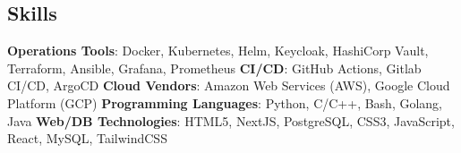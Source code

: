 \documentclass[../main.tex]{subfiles}
\begin{document}
\begin{category}
\section{Skills}
    \citembullet \textbf{Operations Tools}: Docker, Kubernetes, Helm, Keycloak, HashiCorp Vault, Terraform, 
    Ansible, Grafana, Prometheus 
    \citembullet \textbf{CI/CD}: GitHub Actions, Gitlab CI/CD, ArgoCD
    \citembullet \textbf{Cloud Vendors}: Amazon Web Services (AWS), Google Cloud Platform (GCP)
    \citembullet \textbf{Programming Languages}: Python, C/C++, Bash, Golang, Java
    \citembullet \textbf{Web/DB Technologies}: HTML5, NextJS, PostgreSQL, CSS3, JavaScript, React, MySQL, TailwindCSS
    \\[-12pt]
\end{category}
\end{document}
